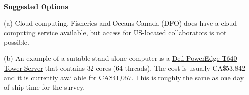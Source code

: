 \documentclass[12pt]{book}\usepackage[]{graphicx}\usepackage[]{color}
\begin{document}
{\bf Suggested Options}

(a) Cloud computing. Fisheries and Oceans Canada (DFO) does have a cloud
computing service available, but access for US-located collaborators is not possible.

(b) An example of a suitable stand-alone computer is a
\href{http://bit.ly/hake-power-computer}{\underline{Dell PowerEdge T640 Tower Server}}
that contains 32 cores (64 threads). The cost is usually CA\$53,842 and it is
currently available for CA\$31,057. This is roughly the same as one day of ship
time for the survey.






\end{document}
